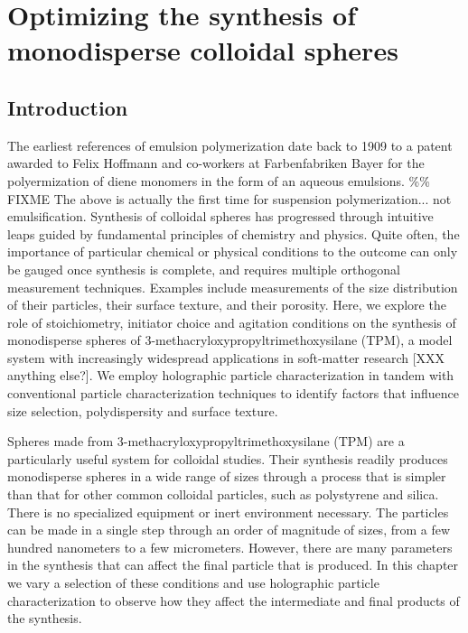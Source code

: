 \chapter{Optimizing the synthesis of monodisperse colloidal spheres}
\label{ch:synthesis}

\section{Introduction}

The earliest references of emulsion polymerization date back to 1909 \cite{bayer1909,finch03}
to a patent awarded to Felix Hoffmann and co-workers at Farbenfabriken Bayer for the
polyermization of diene monomers in the form of an aqueous emulsions.
\%\% FIXME The above is actually the first time for suspension polymerization... not emulsification.
Synthesis of colloidal spheres has progressed through
intuitive leaps guided by fundamental principles of chemistry
and physics.  Quite often, the importance of particular chemical
or physical conditions to the outcome can only be gauged once
synthesis is complete, and requires multiple orthogonal measurement
techniques. Examples include measurements of the size distribution
of their particles, their surface texture, and their porosity.
Here, we explore the role of stoichiometry, initiator choice and
agitation conditions on the synthesis of
monodisperse spheres of
\num{3}-methacryloxypropyltrimethoxysilane (TPM),
a model system with increasingly widespread applications
in soft-matter research [XXX anything else?].
We employ holographic particle characterization
in tandem with conventional particle characterization
techniques to identify factors that 
influence size selection, polydispersity and surface texture.

Spheres made from  \num{3}-methacryloxypropyltrimethoxysilane (TPM) are a 
particularly useful system for colloidal studies. Their synthesis readily 
produces monodisperse spheres in a wide range of sizes through a process 
that is simpler than that for other common colloidal particles, such 
as polystyrene and silica. There is no specialized 
equipment or inert environment necessary. The particles can be made 
in a single step through an order of magnitude of sizes, from a few 
hundred nanometers to a few micrometers. However, there are many 
parameters in the synthesis that can affect the final particle that 
is produced. In this chapter we vary a selection of these conditions 
and use holographic particle characterization to observe how they affect the 
intermediate and final products of the synthesis.

